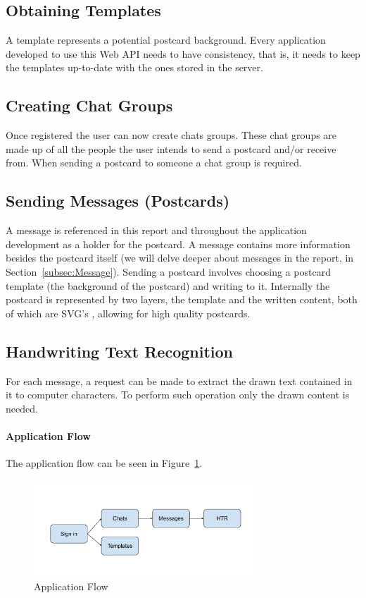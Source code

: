 \subsection{Obtaining Templates}
A template represents a potential postcard background. Every application developed to use this Web API needs to have consistency, that is, it needs to keep the templates up-to-date with the ones stored in the server.


\subsection{Creating Chat Groups}
Once registered the user can now create chats groups. These chat groups are made up of all the people the user intends to send a postcard and/or receive from.
When sending a postcard to someone a chat group is required.  

\subsection{Sending Messages (Postcards)}
A message is referenced in this report and throughout the application development as a holder for the postcard. A message contains more information besides the postcard itself (we will delve deeper about messages in the report, in Section~\ref{subsec:Message}).
Sending a postcard involves choosing a postcard template (the background of the postcard) and  writing to it. 
Internally the postcard is represented by two layers, the template and the written content, both of which are SVG's \textit{\cite{SVG}}, allowing for high quality postcards. 

\subsection{Handwriting Text Recognition}
For each message, a request can be made to extract the drawn text contained in it to computer characters. To perform such operation only the drawn content is needed.

\bigskip

\paragraph{Application Flow}

The application flow can be seen in Figure~\ref{fig:AppFlow}.

\begin{figure}[!ht]
	\centering
	\includegraphics[width=0.75\textwidth]{./Chapter3/Figures/Application Flow}
	\caption{Application Flow}
	\label{fig:AppFlow}
\end{figure}